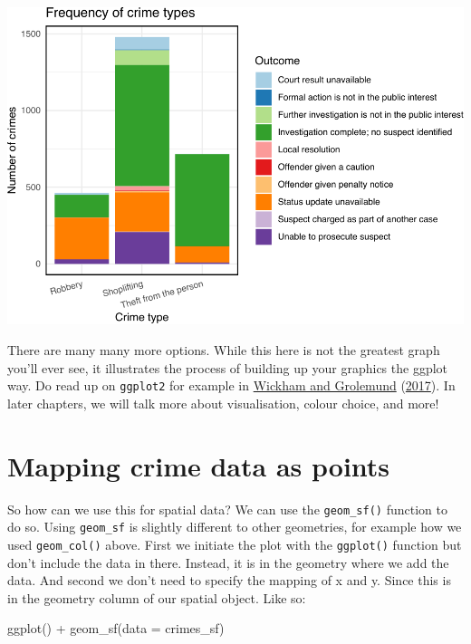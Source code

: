\documentclass[
]{book}
\newenvironment{Shaded}{\begin{snugshade}}{\end{snugshade}}
\newcommand{\AttributeTok}[1]{\textcolor[rgb]{0.77,0.63,0.00}{#1}}
\newcommand{\FunctionTok}[1]{\textcolor[rgb]{0.00,0.00,0.00}{#1}}
\newcommand{\NormalTok}[1]{#1}
\newcommand{\SpecialCharTok}[1]{\textcolor[rgb]{0.00,0.00,0.00}{#1}}
\begin{document}
\includegraphics{crime_mapping_files/figure-latex/unnamed-chunk-13-1.pdf}

There are many many more options. While this here is not the greatest graph you'll ever see, it illustrates the process of building up your graphics the ggplot way. Do read up on \texttt{ggplot2} for example in \protect\hyperlink{ref-Wickham_2017}{Wickham and Grolemund} (\protect\hyperlink{ref-Wickham_2017}{2017}). In later chapters, we will talk more about visualisation, colour choice, and more!

\hypertarget{mapping-crime-data-as-points}{%
\section{Mapping crime data as points}\label{mapping-crime-data-as-points}}

So how can we use this for spatial data? We can use the \texttt{geom\_sf()} function to do so. Using \texttt{geom\_sf} is slightly different to other geometries, for example how we used \texttt{geom\_col()} above. First we initiate the plot with the \texttt{ggplot()} function but don't include the data in there. Instead, it is in the geometry where we add the data. And second we don't need to specify the mapping of x and y. Since this is in the geometry column of our spatial object. Like so:

\begin{Shaded}
\begin{Highlighting}[]
\FunctionTok{ggplot}\NormalTok{() }\SpecialCharTok{+} 
  \FunctionTok{geom\_sf}\NormalTok{(}\AttributeTok{data =}\NormalTok{ crimes\_sf)}
\end{Highlighting}
\end{Shaded}
\end{document}
